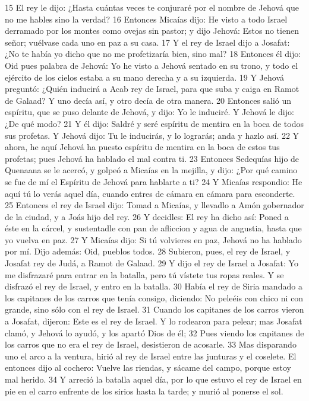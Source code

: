 15 El rey le dijo: ¿Hasta cuántas veces te conjuraré por el nombre de Jehová que no me hables sino la verdad?
16 Entonces Micaías dijo: He visto a todo Israel derramado por los montes como ovejas sin pastor; y dijo Jehová: Estos no tienen señor; vuélvase cada uno en paz a su casa.
17 Y el rey de Israel dijo a Josafat: ¿No te había yo dicho que no me profetizaría bien, sino mal?
18 Entonces él dijo: Oid pues palabra de Jehová: Yo he visto a Jehová sentado en su trono, y todo el ejército de los cielos estaba a su mano derecha y a su izquierda.
19 Y Jehová preguntó: ¿Quién inducirá a Acab rey de Israel, para que suba y caiga en Ramot de Galaad?  Y uno decía así, y otro decía de otra manera.
20 Entonces salió un espíritu, que se puso delante de Jehová, y dijo: Yo le induciré. Y Jehová le dijo: ¿De qué modo?
21 Y él dijo: Saldré y seré espíritu de mentira en la boca de todos sus profetas. Y Jehová dijo: Tu le inducirás, y lo lograrás; anda y hazlo así.
22 Y ahora, he aquí Jehová ha puesto espíritu de mentira en la boca de estos tus profetas; pues Jehová ha hablado el mal contra ti.
23 Entonces Sedequías hijo de Quenaana se le acercó, y golpeó a Micaías en la mejilla, y dijo: ¿Por qué camino se fue de mí el Espíritu de Jehová para hablarte a ti?
24 Y Micaías respondio: He aquí tú lo verás aquel día, cuando entres de cámara en cámara para esconderte.
25 Entonces el rey de Israel dijo: Tomad a Micaías, y llevadlo a Amón gobernador de la ciudad, y a Joás hijo del rey.
26 Y decidles: El rey ha dicho así: Poned a éste en la cárcel, y sustentadle con pan de afliccion y agua de angustia, hasta que yo vuelva en paz.
27 Y Micaías dijo: Si tú volvieres en paz, Jehová no ha hablado por mí. Dijo además: Oid, pueblos todos.
28 Subieron, pues, el rey de Israel, y Josafat rey de Judá, a Ramot de Galaad.
29 Y dijo el rey de Israel a Josafat: Yo me disfrazaré para entrar en la batalla, pero tú vístete tus ropas reales. Y se disfrazó el rey de Israel, y entro en la batalla.
30 Había el rey de Siria mandado a los capitanes de los carros que tenía consigo, diciendo: No peleéis con chico ni con grande, sino sólo con el rey de Israel.
31 Cuando los capitanes de los carros vieron a Josafat, dijeron: Este es el rey de Israel. Y lo rodearon para pelear; mas Josafat clamó, y Jehová lo ayudó, y los apartó Dios de él;
32 Pues viendo los capitanes de los carros que no era el rey de Israel, desistieron de acosarle.
33 Mas disparando uno el arco a la ventura, hirió al rey de Israel entre las junturas y el coselete. El entonces dijo al cochero: Vuelve las riendas, y sácame del campo, porque estoy mal herido.
34 Y arreció la batalla aquel día, por lo que estuvo el rey de Israel en pie en el carro enfrente de los sirios hasta la tarde; y murió al ponerse el sol. 

